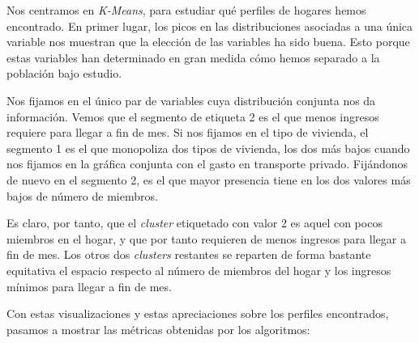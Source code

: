 \documentclass[11pt]{article}
\begin{document}
Nos centramos en \emph{K-Means}, para estudiar qué perfiles de hogares hemos encontrado. En primer lugar, los picos en las distribuciones asociadas a una única variable nos muestran que la elección de las variables ha sido buena. Esto porque estas variables han determinado en gran medida cómo hemos separado a la población bajo estudio.

Nos fijamos en el único par de variables cuya distribución conjunta nos da información. Vemos que el segmento de etiqueta 2 es el que menos ingresos requiere para llegar a fin de mes. Si nos fijamos en el tipo de vivienda, el segmento 1 es el que monopoliza dos tipos de vivienda, los dos más bajos cuando nos fijamos en la gráfica conjunta con el gasto en transporte privado. Fijándonos de nuevo en el segmento 2, es el que mayor presencia tiene en los dos valores más bajos de número de miembros.

Es claro, por tanto, que el \emph{cluster} etiquetado con valor 2 es aquel con pocos miembros en el hogar, y que por tanto requieren de menos ingresos para llegar a fin de mes. Los otros dos \emph{clusters} restantes se reparten de forma bastante equitativa el espacio respecto al número de miembros del hogar y los ingresos mínimos para llegar a fin de mes.

Con estas visualizaciones y estas apreciaciones sobre los perfiles encontrados, pasamos a mostrar las métricas obtenidas por los algoritmos:

\begin{table}[H]
\begin{center}
\end{center}
\caption{Resultados de los algoritmos según distintas métricas de evaluación}
    \label{resultados_stcase01:tabla}
\end{table}
\end{document}
